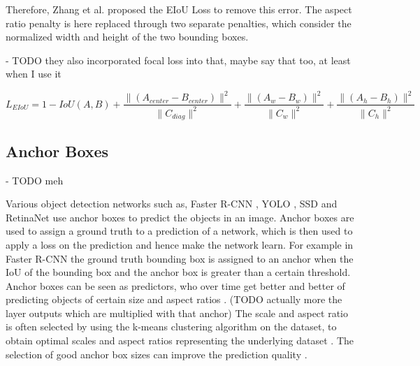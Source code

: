 Therefore, Zhang et al. \cite{eiou} proposed the \ac{EIoU} Loss to remove this error.
The aspect ratio penalty is here replaced through two separate penalties, which consider the normalized width and height of the two bounding boxes.

- TODO they also incorporated focal loss into that, maybe say that too, at least when I use it

\begin{equation}
    L_{EIoU} = 1 - IoU(A, B) + \frac{\|(A_{center} - B_{center})\|^2}{\|C_{diag}\|^2} + \frac{\|(A_{w} - B_{w})\|^2}{\|C_w\|^2} + \frac{\|(A_{h} - B_{h})\|^2}{\|C_h\|^2}
    \label{eq:eiou_loss}
\end{equation}

\subsection{Anchor Boxes}

- TODO meh

Various object detection networks such as, Faster \ac{R-CNN} \cite{faster_rcnn}, \ac{YOLO} \cite{yolov1}, \ac{SSD} \cite{ssd} and RetinaNet \cite{focalloss} use anchor boxes to predict the objects in an image.
Anchor boxes are used to assign a ground truth to a prediction of a network, which is then used to apply a loss on the prediction and hence make the network learn.
For example in Faster \ac{R-CNN} the ground truth bounding box is assigned to an anchor when the \ac{IoU} of the bounding box and the anchor box is greater than a certain threshold.
Anchor boxes can be seen as predictors, who over time get better and better of predicting objects of certain size and aspect ratios \cite{yolov1}. (TODO actually more the layer outputs which are multiplied with that anchor)
The scale and aspect ratio is often selected by using the k-means clustering algorithm on the dataset, to obtain optimal scales and aspect ratios representing the underlying dataset \cite{yolov2}.
The selection of good anchor box sizes can improve the prediction quality \cite{faster_rcnn}.
